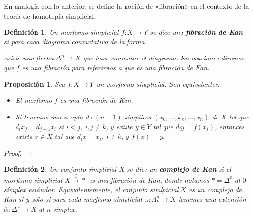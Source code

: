 \documentclass[11pt]{report}
\theoremstyle{colored}
\newtheorem{definition}{Definición}[section]
\newtheorem{proposition}{Proposición}[section]
\renewcommand{\ss}[1]{\Delta^{#1}}
\newcommand{\horn}[2]{\Lambda^{#1}_{#2}}
\newcommand{\guill}[1]{«#1»}
\begin{document}
En analogía con lo anterior, se define la noción de \guill{fibración} en el contexto de la teoría de homotopía simplicial,

\begin{definition} Un morfismo simplicial $f : X \to Y$ se dice una \textbf{fibración de Kan} si para cada diagrama conmutativo de la forma
\begin{center}
\end{center}
existe una flecha $\ss{n} \to X$ que hace conmutar el diagrama. En ocasiones diremos que $f$ es una fibración para referirnos a que es una fibración de Kan.
\end{definition}

\begin{proposition}\label{equiv-fib-kan} Sea $f : X \to Y$ un morfismo simplicial. Son equivalentes:
\begin{itemize}
\item[(i)] El morfismo $f$ es una fibración de Kan.
\item[(ii)] Si tenemos una $n$-upla de $(n-1)$-símplices $(x_0,\dots,\widehat{x}_k,\dots, x_n)$ de $X$ tal que $d_ix_j = d_{j-1}x_i$ si $i < j, \ i,j \neq k$, y existe $y \in Y$ tal que $d_iy = f(x_i)$, entonces existe $x \in X$ tal que $d_ix = x_i$, $i \neq k$, y $f(x) = y$.
\end{itemize}
\end{proposition}
\begin{proof}
\end{proof}

\begin{definition} Un conjunto simplicial $X$ se dice un \textbf{complejo de Kan} si el morfismo simplicial $X \xrightarrow{!\exists} \ast$ es una fibración de Kan, donde notamos $\ast = \ss{0}$ al $0$-símplex estándar. Equivalentemente, el conjunto simlpicial $X$ es un complejo de Kan sí y sólo si para cada morfismo simplicial $\alpha : \horn{n}{k} \to X$ tenemos una extensión $\overline{\alpha} : \ss{n} \to X$ al $n$-símplex,
\begin{center}
\end{center}
\end{definition}
\end{document}
